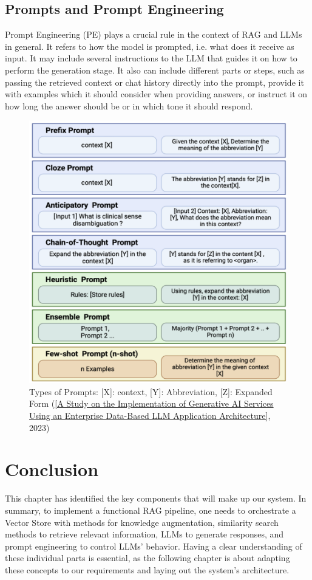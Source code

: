 \subsection{Prompts and Prompt Engineering}
Prompt Engineering (PE) plays a crucial rule in the context of RAG and LLMs in general. It refers to how the model is prompted, i.e. what does it receive as input. It may include several instructions to the LLM that guides it on how to perform the generation stage. It also can include different parts or steps, such as passing the retrieved context or chat history directly into the prompt, provide it with examples which it should consider when providing answers, or instruct it on how long the answer should be or in which tone it should respond.
\begin{figure}[htbp]
    \centering
    \includegraphics[width=\linewidth]{./figures/prompt-types.png}
    \caption{Types of Prompts: [X]: context, [Y]: Abbreviation, [Z]: Expanded Form
    (\href{https://www.oajaiml.com/uploads/archivepdf/63501191.pdf}{[A Study on the Implementation of Generative AI Services Using an Enterprise Data-Based LLM Application Architecture]}, 2023)}
\end{figure}

\section{Conclusion}
This chapter has identified the key components that will make up our system. In summary, to implement a functional RAG pipeline, one needs to orchestrate a Vector Store with methods for knowledge augmentation, similarity search methods to retrieve relevant information, LLMs to generate responses, and prompt engineering to control LLMs' behavior.\newline
Having a clear understanding of these individual parts is essential, as the following chapter is about adapting these concepts to our requirements and laying out the system's architecture.